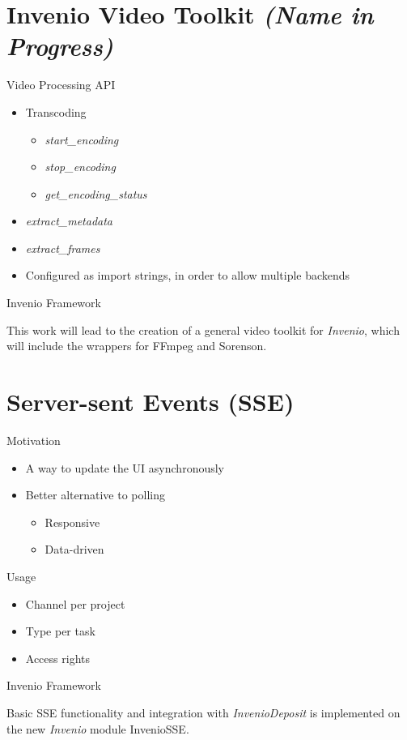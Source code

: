 \documentclass{beamer}
\newcommand{\contrib}[1]{
  \vfill
  \begin{alertblock}{Invenio Framework}
    #1
  \end{alertblock}
}
\begin{document}
	\section{Invenio Video Toolkit \newline \it{(Name in Progress)}}
  \begin{frame}{Video Processing API}
    	\begin{itemize}
		  \item{Transcoding}
		  \begin{itemize}
		    \item{\emph{start_encoding}}
		    \item{\emph{stop_encoding}}
		    \item{\emph{get_encoding_status}}
    	  \end{itemize}
		  \item{\emph{extract_metadata}}
		  \item{\emph{extract_frames}}
		  \item{Configured as import strings, in order to allow \alert{multiple backends}}
	  \end{itemize}

	  \contrib{
	    This work will lead to the creation of a general video toolkit for \emph{Invenio}, which will include the wrappers for \alert{FFmpeg} and \alert{Sorenson}.
	  }
	\end{frame}

	\section{Server-sent Events (SSE)}
	\begin{frame}{Motivation}
	    	\begin{itemize}
    	  \item{A way to update the UI \alert{asynchronously}}
		  \item{Better alternative to polling}
    		\begin{itemize}
    		  \item{Responsive}
    		  \item{Data-driven}
	  	  \end{itemize}
	  \end{itemize}
	\end{frame}
	
	\begin{frame}{Usage}
    	\begin{itemize}
    		\item{Channel per project}
    		\item{Type per task}
    		\item{Access rights}
	  \end{itemize}
	  
	  \contrib{
		  Basic SSE functionality and integration with \emph{InvenioDeposit} is implemented on the new \emph{Invenio} module \alert{InvenioSSE}.
		}
	\end{frame}
\end{document}
